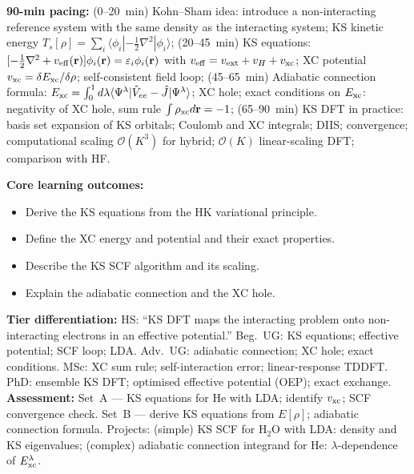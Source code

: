 \documentclass[11pt,a4paper]{article}
\begin{document}
\begin{tcolorbox}[chembox, title={Module~III.3 --- Lecture L03: Kohn--Sham DFT}]
\textbf{90-min pacing:} (0--20~min) Kohn--Sham idea: introduce a non-interacting reference system with the same density as the interacting system; KS kinetic energy $T_s[\rho]=\sum_i\langle\phi_i|-\tfrac{1}{2}\nabla^2|\phi_i\rangle$; (20--45~min) KS equations: $[-\tfrac{1}{2}\nabla^2+v_{\rm eff}(\mathbf{r})]\phi_i(\mathbf{r})=\varepsilon_i\phi_i(\mathbf{r})$ with $v_{\rm eff}=v_{\rm ext}+v_H+v_{\rm xc}$; XC potential $v_{\rm xc}=\delta E_{\rm xc}/\delta\rho$; self-consistent field loop; (45--65~min) Adiabatic connection formula: $E_{\rm xc}=\int_0^1 d\lambda\langle\Psi^\lambda|\hat{V}_{ee}-\hat{J}|\Psi^\lambda\rangle$; XC hole; exact conditions on $E_{\rm xc}$: negativity of XC hole, sum rule $\int\rho_{\rm xc}d\mathbf{r}=-1$; (65--90~min) KS DFT in practice: basis set expansion of KS orbitals; Coulomb and XC integrals; DIIS; convergence; computational scaling $\mathcal{O}(K^3)$ for hybrid; $\mathcal{O}(K)$ linear-scaling DFT; comparison with HF.

\medskip\textbf{Core learning outcomes:}
\begin{itemize}[leftmargin=1.4em,topsep=2pt,itemsep=1pt]
  \item Derive the KS equations from the HK variational principle.
  \item Define the XC energy and potential and their exact properties.
  \item Describe the KS SCF algorithm and its scaling.
  \item Explain the adiabatic connection and the XC hole.
\end{itemize}
\medskip\textbf{Tier differentiation:}
HS: ``KS DFT maps the interacting problem onto non-interacting electrons in an effective potential.''
Beg.\ UG: KS equations; effective potential; SCF loop; LDA.
Adv.\ UG: adiabatic connection; XC hole; exact conditions.
MSc: XC sum rule; self-interaction error; linear-response TDDFT.
PhD: ensemble KS DFT; optimised effective potential (OEP); exact exchange.
\medskip\textbf{Assessment:}
Set~A --- KS equations for He with LDA; identify $v_{\rm xc}$; SCF convergence check.
Set~B --- derive KS equations from $E[\rho]$; adiabatic connection formula.
Projects: (simple) KS SCF for H$_2$O with LDA: density and KS eigenvalues; (complex) adiabatic connection integrand for He: $\lambda$-dependence of $E_{\rm xc}^\lambda$.
\end{tcolorbox}

\medskip
\end{document}
